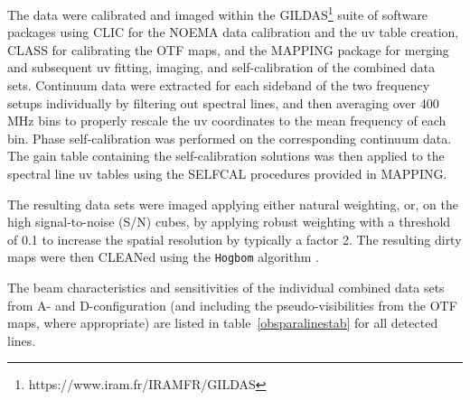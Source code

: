\documentclass{aa}
\begin{document}
The data were calibrated and imaged within the
GILDAS\footnote{https://www.iram.fr/IRAMFR/GILDAS} suite of software
packages using CLIC for the NOEMA data calibration and the uv table 
creation, CLASS for calibrating the OTF maps, and the MAPPING package
for merging and subsequent uv fitting, imaging, and self-calibration of the
combined data sets. Continuum data were extracted for each sideband
of the two frequency setups individually by filtering out spectral
lines, and then averaging over 400\,MHz bins to properly rescale the
uv coordinates to the mean frequency of  each bin. Phase
self-calibration was performed on the corresponding continuum
data. The gain table containing the self-calibration solutions was
then applied to the spectral line uv tables using the SELFCAL
procedures provided in MAPPING.

The resulting data sets were imaged applying either natural weighting,
or, on the high signal-to-noise (S/N) cubes, by applying  robust
weighting with a threshold of 0.1 to increase the spatial resolution
by typically a factor 2. The resulting dirty maps were then CLEANed
using the {\tt Hogbom} algorithm \citep{hog74}. 

The beam characteristics and sensitivities of the individual
combined data sets from A- and D-configuration (and including the
pseudo-visibilities from the  OTF maps, where appropriate) are listed
in table~\ref{obsparalinestab} for all detected lines.
\end{document}
